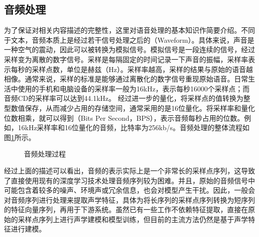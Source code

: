 
\subsection{音频处理}

\parinterval 为了保证对相关内容描述的完整性，这里对语音处理的基本知识作简要介绍。不同于文本，音频本质上是经过若干信号处理之后的{\small{}}（Waveform）。具体来说，声音是一种空气的震动，因此可以被转换为模拟信号。模拟信号是一段连续的信号，经过采样变为离散的数字信号。采样是每隔固定的时间记录一下声音的振幅，采样率表示每秒的采样点数，单位是赫兹（Hz）。采样率越高，采样的结果与原始的语音越相像。通常来说，采样的标准是能够通过离散化的数字信号重现原始语音。日常生活中使用的手机和电脑设备的采样率一般为16kHz，表示每秒16000个采样点；而音频CD的采样率可以达到44.1kHz。 经过进一步的量化，将采样点的值转换为整型数值保存，从而减少占用的存储空间，通常采用的是16位量化。将采样率和量化位数相乘，就可以得到{\small{}}（Bits Per Second，BPS），表示音频每秒占用的位数。例如，16kHz采样率和16位量化的音频，比特率为256kb/s。音频处理的整体流程如图\ref{fig:17-2}所示。

\begin{figure}[htp]
\centering

\caption{音频处理过程}
\label{fig:17-2}
\end{figure}

\parinterval 经过上面的描述可以看出，音频的表示实际上是一个非常长的采样点序列，这导致了直接使用现有的深度学习技术处理音频序列较为困难。并且，原始的音频信号中可能包含着较多的噪声、环境声或冗余信息，也会对模型产生干扰。因此，一般会对音频序列进行处理来提取声学特征，具体为将长序列的采样点序列转换为短序列的特征向量序列，再用于下游系统。虽然已有一些工作不依赖特征提取，直接在原始的采样点序列上进行声学建模和模型训练，但目前的主流方法仍然是基于声学特征进行建模。

